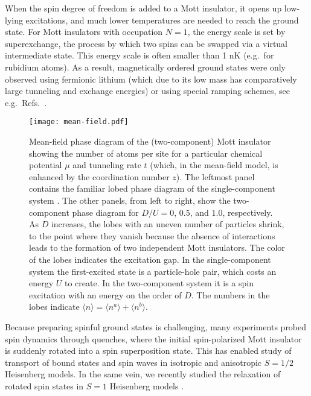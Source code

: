 \documentclass[aps,prl,twocolumn]{revtex4-1}
\begin{document}
When the spin degree of freedom is added to a Mott insulator, it opens up low-lying excitations, and much lower temperatures are needed to reach the ground state. For Mott insulators with occupation $N=1$, the energy scale is set by superexchange, the process by which two spins can be swapped via a virtual intermediate state. This energy scale is often smaller than 1 nK (e.g.\ for rubidium atoms). As a result, magnetically ordered ground states were only observed using fermionic lithium (which due to its low mass has comparatively large tunneling and exchange energies) \cite{Mazurenko17} or using special ramping schemes, see e.g.\ Refs.~\cite{Sun21,Greif15}.

\begin{figure*}
    \centering
    \texttt{[image: mean-field.pdf]}
    \caption{Mean-field phase diagram of the (two-component) Mott insulator showing the number of atoms per site for a particular chemical potential $\mu$ and tunneling rate $t$ (which, in the mean-field model, is enhanced by the coordination number $z$). The leftmost panel contains the familiar lobed phase diagram of the single-component system \cite{Freericks94}. The other panels, from left to right, show the two-component phase diagram for $D/U=0$, $0.5$, and $1.0$, respectively. As $D$ increases, the lobes with an uneven number of particles shrink, to the point where they vanish because the absence of interactions leads to the formation of two independent Mott insulators. The color of the lobes indicates the excitation gap. In the single-component system the first-excited state is a particle-hole pair, which costs an energy $U$ to create. In the two-component system it is a spin excitation with an energy on the order of $D$. The numbers in the lobes indicate $\langle n \rangle = \langle n^a \rangle + \langle n^b \rangle$.}
    \label{fig:phase-diagram}
\end{figure*}

Because preparing spinful ground states is challenging, many experiments probed spin dynamics through quenches, where the initial spin-polarized Mott insulator is suddenly rotated into a spin superposition state. This has enabled study of transport of bound states \cite{Fukuhara13} and spin waves in isotropic \cite{Hild14} and anisotropic \cite{Jepsen20, Jepsen21} $S = 1/2$ Heisenberg models. In the same vein, we recently studied the relaxation of rotated spin states in $S = 1$ Heisenberg models \cite{Chung21}.
\end{document}
